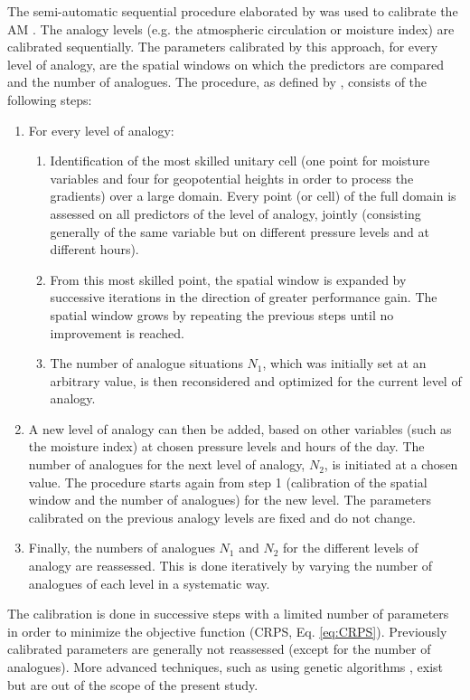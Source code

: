 \documentclass[hess, manuscript]{copernicus}
\begin{document}
	The semi-automatic sequential procedure elaborated by \citet{Bontron2004} was used to calibrate the AM \cite[see also ][]{Radanovics2013, BenDaoud2016}. The analogy levels (e.g. the atmospheric circulation or moisture index) are calibrated sequentially. The parameters calibrated by this approach, for every level of analogy, are the spatial windows on which the predictors are compared and the number of analogues. The procedure, as defined by \citet{Bontron2004}, consists of the following steps:
	
	\begin{enumerate}
		\item For every level of analogy:
		\begin{enumerate}
			\item Identification of the most skilled unitary cell (one point for moisture variables and four for geopotential heights in order to process the gradients) over a large domain. Every point (or cell) of the full domain is assessed on all predictors of the level of analogy, jointly (consisting generally of the same variable but on different pressure levels and at different hours).
			\item From this most skilled point, the spatial window is expanded by successive iterations in the direction of greater performance gain. The spatial window grows by repeating the previous steps until no improvement is reached.
			\item The number of analogue situations $N_{1}$, which was initially set at an arbitrary value, is then reconsidered and optimized for the current level of analogy.
		\end{enumerate}
		\item A new level of analogy can then be added, based on other variables (such as the moisture index) at chosen pressure levels and hours of the day. The number of analogues for the next level of analogy, $N_{2}$, is initiated at a chosen value. The procedure starts again from step 1 (calibration of the spatial window and the number of analogues) for the new level. The parameters calibrated on the previous analogy levels are fixed and do not change. 
		\item Finally, the numbers of analogues $N_{1}$ and $N_{2}$ for the different levels of analogy are reassessed. This is done iteratively by varying the number of analogues of each level in a systematic way.
	\end{enumerate}
	
	The calibration is done in successive steps with a limited number of parameters in order to minimize the objective function (CRPS, Eq. \ref{eq:CRPS}). Previously calibrated parameters are generally not reassessed (except for the number of analogues). More advanced techniques, such as using genetic algorithms \citep{Horton2017}, exist but are out of the scope of the present study.
	
\end{document}
